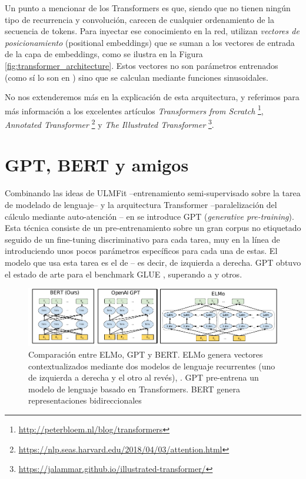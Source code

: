 Un punto a mencionar de los Transformers es que, siendo que no tienen ningún tipo de recurrencia y convolución, carecen de cualquier ordenamiento de la secuencia de tokens. Para inyectar ese conocimiento en la red, utilizan \emph{vectores de posicionamiento} (positional embeddings) que se suman a los vectores de entrada de la capa de embeddings, como se ilustra en la Figura \ref{fig:transformer_architecture}. Estos vectores no son parámetros entrenados (como sí lo son en \bert{}) sino que se calculan mediante funciones sinusoidales.


No nos extenderemos más en la explicación de esta arquitectura, y referimos para más información a los excelentes artículos \emph{Transformers from Scratch} \footnote{\url{http://peterbloem.nl/blog/transformers}}, \emph{Annotated Transformer} \footnote{\url{https://nlp.seas.harvard.edu/2018/04/03/attention.html}} y \emph{The Illustrated Transformer} \footnote{\url{https://jalammar.github.io/illustrated-transformer/}}.


\section{GPT, BERT y amigos}

\label{sec:02_bert}

Combinando las ideas de ULMFit --entrenamiento semi-supervisado sobre la tarea de modelado de lenguaje-- y la arquitectura Transformer --paralelización del cálculo mediante auto-atención -- en \citet{radford2018improving} se introduce GPT (\emph{generative pre-training}). Esta técnica consiste de un pre-entrenamiento sobre un gran corpus no etiquetado seguido de un fine-tuning discriminativo para cada tarea, muy en la línea de \citet{howard-ruder-2018-universal} introduciendo unos pocos parámetros específicos para cada una de estas. El modelo que usa esta tarea es el de  -- es decir, de izquierda a derecha. GPT obtuvo el estado de arte para el benchmark GLUE \cite{wang-etal-2018-glue}, superando a \elmo{} y otros.


\begin{figure}[t]
    \centering
    \includegraphics[width=\textwidth]{img/02/gpt_vs_bert.pdf}
    \caption{Comparación entre ELMo, GPT y BERT. ELMo genera vectores contextualizados mediante dos modelos de lenguaje recurrentes (uno de izquierda a derecha y el otro al revés), . GPT pre-entrena un modelo de lenguaje basado en Transformers. BERT genera representaciones bidireccionales }
    \label{fig:gpt_vs_bert_vs_elmo}
\end{figure}


